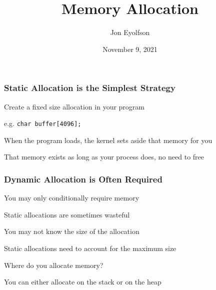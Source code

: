 

\title{Memory Allocation}
\author{Jon Eyolfson}
\date{November 9, 2021}


  \begin{frame}
    \titlepage
  \end{frame}

  \begin{frame}
    \frametitle{Static Allocation is the Simplest Strategy}

    Create a fixed size allocation in your program

    \hspace{2em} e.g. \lstinline|char buffer[4096];|

    \vspace{2em}

    When the program loads, the kernel sets aside that memory
    for you

    \vspace{2em}

    That memory exists as long as your process does, no need to free
  \end{frame}

  \begin{frame}
    \frametitle{Dynamic Allocation is Often Required}

    You may only conditionally require memory

    \hspace{2em} Static allocations are sometimes wasteful

    \vspace{2em}

    You may not know the size of the allocation

    \hspace{2em} Static allocations need to account for the maximum size

    \vspace{2em}

    Where do you allocate memory?

    \hspace{2em} You can either allocate on the stack or on the heap
  \end{frame}

